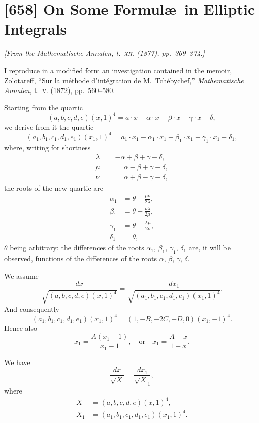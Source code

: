 \documentclass[11pt,a4paper]{article}
\theoremstyle{plain}
\theoremstyle{definition}
\begin{document}
\section{[658] On Some Formul\ae\ in Elliptic Integrals}
\label{sec:658}

\noindent\textit{[From the \emph{Mathematische Annalen}, t.~\textsc{xii}. (1877), pp.~369--374.]}

\medskip

I reproduce in a modified form an investigation contained in the memoir, Zolotareff, ``Sur la m\'ethode d'int\'egration de M.~Tch\'ebychef,'' \emph{Mathematische Annalen}, t.~\textsc{v}. (1872), pp.~560--580.

Starting from the quartic
\[
(a, b, c, d, e)(x, 1)^4 = a \cdot x - \alpha \cdot x - \beta \cdot x - \gamma \cdot x - \delta,
\]
we derive from it the quartic
\[
(a_1, b_1, c_1, d_1, e_1)(x_1, 1)^4 = a_1 \cdot x_1 - \alpha_1 \cdot x_1 - \beta_1 \cdot x_1 - \gamma_1 \cdot x_1 - \delta_1,
\]
where, writing for shortness
\begin{align*}
\lambda &= -\alpha + \beta + \gamma - \delta, \\
\mu &= \phantom{-}\alpha - \beta + \gamma - \delta, \\
\nu &= \phantom{-}\alpha + \beta - \gamma - \delta,
\end{align*}
the roots of the new quartic are
\begin{align*}
\alpha_1 &= \theta + \frac{\mu\nu}{2\lambda}, \\
\beta_1 &= \theta + \frac{\nu\lambda}{2\mu}, \\
\gamma_1 &= \theta + \frac{\lambda\mu}{2\nu}, \\
\delta_1 &= \theta,
\end{align*}
$\theta$ being arbitrary: the differences of the roots $\alpha_1$, $\beta_1$, $\gamma_1$, $\delta_1$ are, it will be observed, functions of the differences of the roots $\alpha$, $\beta$, $\gamma$, $\delta$.

We assume
\[
\frac{dx}{\sqrt{(a, b, c, d, e)(x, 1)^4}} = \frac{dx_1}{\sqrt{(a_1, b_1, c_1, d_1, e_1)(x_1, 1)^4}}.
\]
And consequently
\[
(a_1, b_1, c_1, d_1, e_1)(x_1, 1)^4 = (1, -B, -2C, -D, 0)(x_1, -1)^4.
\]
Hence also
\[
x_1 = \frac{A(x_1 - 1)}{x_1 - 1}, \quad \text{or} \quad x_1 = \frac{A + x}{1 + x}.
\]

We have
\[
\frac{dx}{\surd X} = \frac{dx_1}{\surd X_1},
\]
where
\begin{align*}
X &= (a, b, c, d, e)(x, 1)^4, \\
X_1 &= (a_1, b_1, c_1, d_1, e_1)(x_1, 1)^4.
\end{align*}
\end{document}
